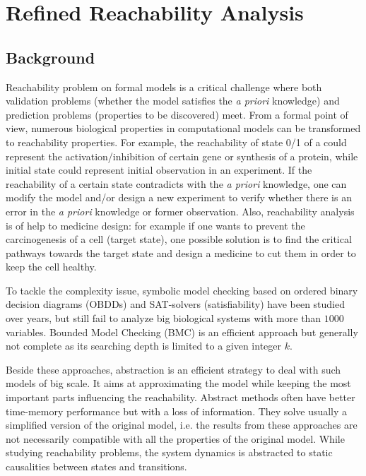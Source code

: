 \chapter{Refined Reachability Analysis}
\section{Background}

Reachability problem on formal models is a critical challenge where both validation problems (whether the model satisfies the \textit{a priori} knowledge) and prediction problems (properties to be discovered) meet. 
From a formal point of view, numerous biological properties in computational models can be transformed to reachability properties. 
For example, the reachability of state 0/1 of a could represent the activation/inhibition of certain gene or synthesis of a protein, while initial state could represent initial observation in an experiment.
If the reachability of a certain state contradicts with the \textit{a priori} knowledge, one can modify the model and/or design a new experiment to verify whether there is an error in the \textit{a priori} knowledge or former observation. 
Also, reachability analysis is of help to medicine design: for example if one wants to prevent the carcinogenesis of a cell (target state), one possible solution is to find the critical pathways towards the target state and design a medicine to cut them in order to keep the cell healthy.

To tackle the complexity issue, symbolic model checking \cite{burch1992symbolic} based on ordered binary decision diagrams (OBDDs) and SAT-solvers (satisfiability) \cite{abdulla2000symbolic} have been studied over years, but still fail to analyze big biological systems with more than $1000$ variables. 
Bounded Model Checking (BMC) \cite{clarke2001bounded} is an efficient approach but generally not complete as its searching depth is limited to a given integer $k$.

Beside these approaches, abstraction is an efficient strategy to deal with such models of big scale. 
It aims at approximating the model while keeping the most important parts influencing the reachability.
Abstract methods often have better time-memory performance but with a loss of information. 
They solve usually a simplified version of the original model, i.e. the results from these approaches are not necessarily compatible with all the properties of the original model.
While studying reachability problems, the system dynamics is abstracted to static causalities between states and transitions.

